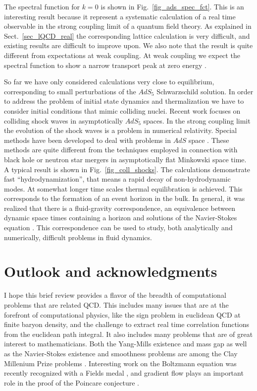 \vspace*{0.3cm} 
The spectral function for $k=0$ is shown in Fig.~\ref{fig_ads_spec_fct}. This 
is an interesting result because it represent a systematic calculation of a
real time observable in the strong coupling limit of a quantum field theory. 
As explained in Sect.~\ref{sec_lQCD_real} the corresponding lattice 
calculation is very difficult, and existing results are difficult to improve 
upon. We also note that the result is quite different from expectations at 
weak coupling. At weak coupling we expect the spectral function to show a 
narrow transport peak at zero energy \cite{Schaefer:2014awa}.

 So far we have only considered calculations very close to equilibrium, 
corresponding to small perturbations of the $AdS_5$ Schwarzschild solution. 
In order to address the problem of initial state dynamics and thermalization
we have to consider initial conditions that mimic colliding nuclei. Recent
work focuses on colliding shock waves in asymptotically $AdS_5$ spaces. 
In the strong coupling limit the evolution of the shock waves is a problem
in numerical relativity. Special methods have been developed to deal 
with problems in $AdS$ space \cite{Chesler:2013lia}. These methods are 
quite different from the techniques employed in connection with black
hole or neutron star mergers in asymptotically flat Minkowski space time. 
A typical result is shown in Fig.~\ref{fig_coll_shocks}. The calculations
demonstrate fast ``hydrodynamization'', that means a rapid decay of 
non-hydrodynamic modes. At somewhat longer time scales thermal 
equilibration is achieved. This corresponds to the formation of an 
event horizon in the bulk. In general, it was realized that there 
is a fluid-gravity correspondence, an equivalence between dynamic 
space times containing a horizon and solutions of the Navier-Stokes
equation \cite{Rangamani:2009xk}. This correspondence can be used 
to study, both analytically and numerically, difficult problems in 
fluid dynamics.  

\section{Outlook and acknowledgments}
\label{sec_out}

 I hope this brief review provides a flavor of the breadth of computational
problems that are related QCD. This includes many issues that are at the 
forefront of computational physics, like the sign problem in euclidean 
QCD at finite baryon density, and the challenge to extract real time 
correlation functions from the euclidean path integral. It also includes
many problems that are of great interest to mathematicians. Both the 
Yang-Mills existence and mass gap as well as the Navier-Stokes existence 
and smoothness problems are among the Clay Millenium Prize problems
\cite{Clay-YM,Clay-NS}. Interesting work on the Boltzmann equation was 
recently recognized with a Fields medal \cite{Villani:2009}, and gradient 
flow plays an important role in the proof of the Poincare conjecture
\cite{Perelman}. 


